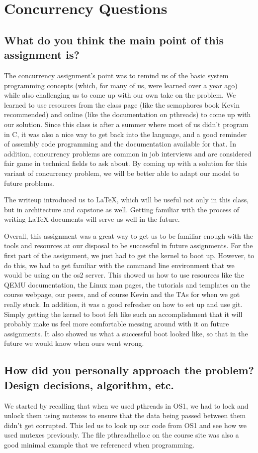 \documentclass[letterpaper,10pt,titlepage]{article}
\begin{document}
\section{Concurrency Questions}

\subsection{What do you think the main point of this assignment is?}
The concurrency assignment's point was to remind us of the basic system programming concepts (which, for many of us, were learned over a year ago) while also challenging us to come up with our own take on the problem.
We learned to use resources from the class page (like the semaphores book Kevin recommended) and online (like the documentation on pthreads) to come up with our solution.
Since this class is after a summer where most of us didn’t program in C, it was also a nice way to get back into the language, and a good reminder of assembly code programming and the documentation available for that.
In addition, concurrency problems are common in job interviews and are considered fair game in technical fields to ask about.
By coming up with a solution for this variant of concurrency problem, we will be better able to adapt our model to future problems.


The writeup introduced us to LaTeX, which will be useful not only in this class, but in architecture and capstone as well.
Getting familiar with the process of writing LaTeX documents will serve us well in the future.


Overall, this assignment was a great way to get us to be familiar enough with the tools and resources at our disposal to be successful in future assignments.
For the first part of the assignment, we just had to get the kernel to boot up.
However, to do this, we had to get familiar with the command line environment that we would be using on the os2 server.
This showed us how to use resources like the QEMU documentation, the Linux man pages, the tutorials and templates on the course webpage, our peers, and of course Kevin and the TAs for when we got really stuck.
In addition, it was a good refresher on how to set up and use git.
Simply getting the kernel to boot felt like such an accomplishment that it will probably make us feel more comfortable messing around with it on future assignments.
It also showed us what a successful boot looked like, so that in the future we would know when ours went wrong.


\subsection{How did you personally approach the problem? Design decisions, algorithm, etc.}
We started by recalling that when we used pthreads in OS1, we had to lock and unlock them using mutexes to ensure that the data being passed between them didn't get corrupted.
This led us to look up our code from OS1 and see how we used mutexes previously.
The file pthreadhello.c on the course site was also a good minimal example that we referenced when programming.
\end{document}

